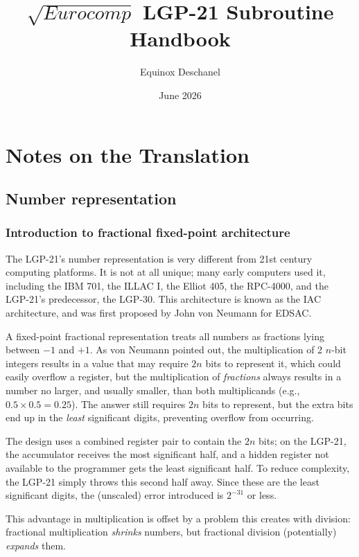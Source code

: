 \documentclass{article}
\title{$\sqrt{Eurocomp}$ LGP-21 Subroutine Handbook}
\author{Equinox Deschanel}
\date{June 2026}
\begin{document}
\maketitle
\tableofcontents
\newpage
\section{Notes on the Translation}
\subsection{Number representation}
\subsubsection*{Introduction to fractional fixed-point architecture}
The LGP-21's number representation is very different from 21st century computing platforms. It is not at all unique; many early computers used it, including the IBM 701\cite{ibm701manual}, the ILLAC I\cite{illiac1954}, the Elliot 405\cite{elliott405}, the RPC-4000\cite{rpc4000manual}, and the LGP-21's predecessor, the LGP-30\cite{lgp30programmingmanual}. This architecture is known as the IAC architecture, and was first proposed by John von Neumann for EDSAC\cite{vonneumann1945first}.

A fixed-point fractional representation treats all numbers as fractions lying between $-1$ and $+1$. As von Neumann pointed out\cite{burks1946preliminary}, the multiplication of 2 $n$-bit integers results in a value that may require $2n$ bits to represent it, which could easily overflow a register, but the multiplication of \emph{fractions} always results in a number no larger, and usually smaller, than both multiplicands (e.g., $0.5 \times 0.5 = 0.25$). The answer still requires $2n$ bits to represent, but the extra bits end up in the \emph{least} significant digits, preventing overflow from occurring.

The design uses a combined register pair to contain the $2n$ bits; on the LGP-21, the accumulator receives the most significant half, and a hidden register not available to the programmer gets the least significant half. To reduce complexity, the LGP-21 simply throws this second half away. Since these are the least significant digits, the (unscaled) error introduced is $2^{-31}$ or less.

This advantage in multiplication is offset by a problem this creates with division: fractional multiplication \emph{shrinks} numbers, but fractional division (potentially) \emph{expands} them.
\end{document}
